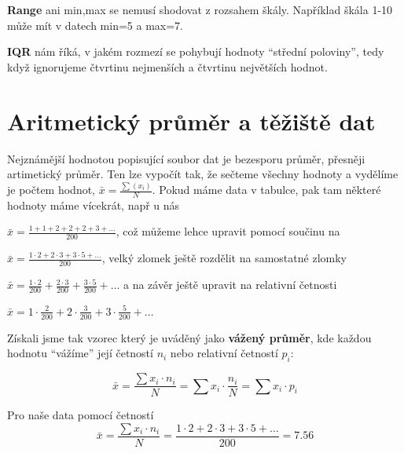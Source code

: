 \documentclass[
  czech,
  11pt,
  letterpaper,
  DIV=11,
  numbers=noendperiod]{scrreprt}
\begin{document}
\begin{tcolorbox}[enhanced jigsaw, arc=.35mm, bottomrule=.15mm, bottomtitle=1mm, breakable, colback=white, colbacktitle=quarto-callout-note-color!10!white, colframe=quarto-callout-note-color-frame, coltitle=black, left=2mm, leftrule=.75mm, opacityback=0, opacitybacktitle=0.6, rightrule=.15mm, title=\textcolor{quarto-callout-note-color}{\faInfo}\hspace{0.5em}{Poznámka}, titlerule=0mm, toprule=.15mm, toptitle=1mm]

\textbf{Range} ani min,max se nemusí shodovat z rozsahem škály.
Například škála 1-10 může mít v datech min=5 a max=7.

\textbf{IQR} nám říká, v jakém rozmezí se pohybují hodnoty ``střední
poloviny'', tedy když ignorujeme čtvrtinu nejmenších a čtvrtinu
největších hodnot.

\end{tcolorbox}

\section{Aritmetický průměr a těžiště
dat}\label{aritmetickuxfd-prux16fmux11br-a-tux11bux17eiux161tux11b-dat}

Nejznámější hodnotou popisující soubor dat je bezesporu průměr, přesněji
artimetický průměr. Ten lze vypočít tak, že sečteme všechny hodnoty a
vydělíme je počtem hodnot, \(\bar{x} = \frac{\sum (x_i)}{N}\). Pokud
máme data v tabulce, pak tam některé hodnoty máme vícekrát, např u nás

\(\bar{x} = \frac{1+1+2+2+2+3+\dots}{200}\), což můžeme lehce upravit
pomocí součinu na

\(\bar{x} = \frac{1\cdot 2+2\cdot 3+3\cdot 5+\dots}{200}\), velký zlomek
ještě rozdělit na samostatné zlomky

\(\bar{x} = \frac{1\cdot 2}{200}+\frac{2\cdot 3}{200}+\frac{3\cdot 5}{200}+\dots\)
a na závěr ještě upravit na relativní četnosti

\(\bar{x} = 1\cdot \frac{2}{200}+2\cdot \frac{3}{200}+3\cdot\frac{5}{200}+\dots\)

Získali jsme tak vzorec který je uváděný jako \textbf{vážený průměr},
kde každou hodnotu ``vážíme'' její četností \(n_i\) nebo relativní
četností \(p_i\):

\[\bar{x} = \frac{\sum x_i\cdot n_i}{N}=\sum x_i\cdot \frac{n_i}{N}=\sum x_i\cdot p_i\]

Pro naše data pomocí četností
\[ \bar{x} =\frac{\sum x_i\cdot n_i}{N} = \frac{1\cdot 2 + 2\cdot 3 + 3\cdot 5 + \dots }{200} = 7.56 \]
\end{document}
